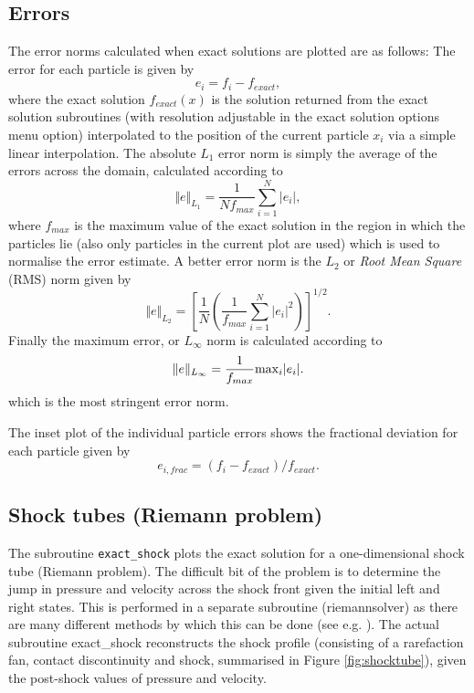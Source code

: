 \documentclass[a4paper,11pt]{article}
\begin{document}
\subsection{Errors}
The error norms calculated when exact solutions are plotted are as follows: The
error for each particle is given by
\begin{equation}
e_i = f_i - f_{exact},
\end{equation}
where the exact solution $f_{exact}(x)$ is the solution returned from the exact
solution subroutines (with resolution adjustable in the exact solution options menu
option) interpolated to the position of the current particle $x_i$ via a simple linear
interpolation. The absolute $L_1$ error norm is simply the average of the errors across
the domain, calculated according to
\begin{equation}
\Vert e \Vert_{L_1} = \frac{1}{N f_{max}} \sum_{i=1}^N \vert e_i \vert,
\end{equation}
where $f_{max}$ is the maximum value of the exact solution in the region in which the
particles lie (also only particles in the current plot are used) which is used to
normalise the error estimate. A better error norm is the $L_2$ or \emph{Root Mean Square}
 (RMS) norm given by
\begin{equation}
\Vert e \Vert_{L_2} = \left[\frac{1}{N} \left( \frac{1}{f_{max}} \sum_{i=1}^N \vert e_i
\vert^2 \right)\right]^{1/2}.
\end{equation}
Finally the maximum error, or $L_\infty$ norm is calculated according to
\begin{equation}
\Vert e \Vert_{L_\infty} = \frac{1}{f_{max}} {\rm max}_i \vert e_i \vert.
\end{equation}
which is the most stringent error norm.

 The inset plot of the individual particle errors shows the fractional deviation for
 each particle given by
\begin{equation}
e_{i,frac} = (f_i - f_{exact}) / f_{exact}.
\end{equation}

\subsection{Shock tubes (Riemann problem)}
 The subroutine \verb+exact_shock+ plots the exact solution for a one-dimensional shock tube
(Riemann problem). The difficult bit of the problem is to determine the jump in
pressure and velocity across the shock front given the initial left and right
states. This is performed in a separate subroutine (riemannsolver) as there are 
many different methods by which this can be done (see e.g. \citealt{toro92}). 
The actual subroutine exact\_shock reconstructs the shock profile (consisting of
a rarefaction fan, contact discontinuity and shock, summarised in Figure
\ref{fig:shocktube}), given the post-shock values of pressure and
velocity. 
\end{document}
